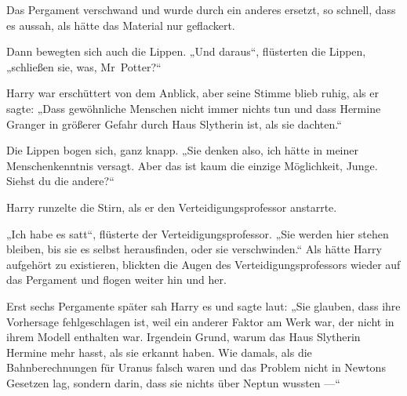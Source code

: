 Das Pergament verschwand und wurde durch ein anderes ersetzt, so schnell, dass es aussah, als hätte das Material nur geflackert.

Dann bewegten sich auch die Lippen.
„Und daraus“, flüsterten die Lippen, „schließen sie, was, Mr~Potter?“

Harry war erschüttert von dem Anblick, aber seine Stimme blieb ruhig, als er sagte:
„Dass gewöhnliche Menschen nicht immer nichts tun und dass Hermine Granger in größerer Gefahr durch Haus Slytherin ist, als sie dachten.“

Die Lippen bogen sich, ganz knapp.
„Sie denken also, ich hätte in meiner Menschenkenntnis versagt. Aber das ist kaum die einzige Möglichkeit, Junge. Siehst du die andere?“

Harry runzelte die Stirn, als er den Verteidigungsprofessor anstarrte.

„Ich habe es satt“, flüsterte der Verteidigungsprofessor.
„Sie werden hier stehen bleiben, bis sie es selbst herausfinden, oder sie verschwinden.“ Als hätte Harry aufgehört zu existieren, blickten die Augen des Verteidigungsprofessors wieder auf das Pergament und flogen weiter hin und her.

Erst sechs Pergamente später sah Harry es und sagte laut:
„Sie glauben, dass ihre Vorhersage fehlgeschlagen ist, weil ein anderer Faktor am Werk war, der nicht in ihrem Modell enthalten war. Irgendein Grund, warum das Haus Slytherin Hermine mehr hasst, als sie erkannt haben. Wie damals, als die Bahnberechnungen für Uranus falsch waren und das Problem nicht in Newtons Gesetzen lag, sondern darin, dass sie nichts über Neptun wussten —“

